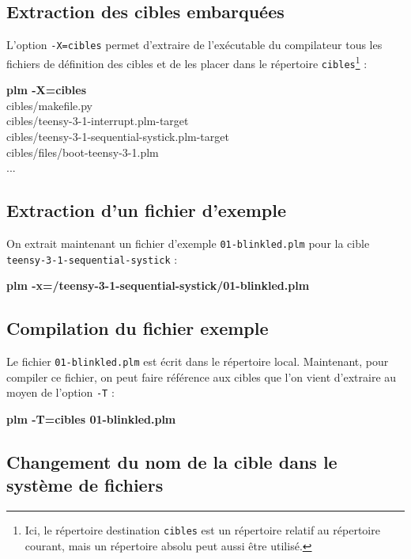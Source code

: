 \subsection{Extraction des cibles embarquées}
L'option \texttt{-X=cibles} permet d'extraire de l'exécutable du compilateur tous les fichiers de définition des cibles et de les placer dans le répertoire \texttt{cibles}\footnote{Ici, le répertoire destination \texttt{cibles} est un répertoire relatif au répertoire courant, mais un répertoire absolu peut aussi être utilisé.} :
\begin{SHELL}
{\bfseries plm -X=cibles}\\
\hspace*{1.2em}cibles/makef{}ile.py\\
\hspace*{1.2em}cibles/teensy-3-1-interrupt.plm-target\\
\hspace*{1.2em}cibles/teensy-3-1-sequential-systick.plm-target\\
\hspace*{1.2em}cibles/files/boot-teensy-3-1.plm\\
\hspace*{1.2em}...
\end{SHELL}

\subsection{Extraction d'un fichier d'exemple}
On extrait maintenant un fichier d'exemple \texttt{01-blinkled.plm} pour la cible \texttt{teensy-3-1-sequential-systick} :
\begin{SHELL}
\bfseries plm -x=/teensy-3-1-sequential-systick/01-blinkled.plm
\end{SHELL}

\subsection{Compilation du fichier exemple}
Le fichier \texttt{01-blinkled.plm} est écrit dans le répertoire local. Maintenant, pour compiler ce fichier, on peut faire référence aux cibles que l'on vient d'extraire au moyen de l'option \texttt{-T} :
\begin{SHELL}
\bfseries plm -T=cibles 01-blinkled.plm
\end{SHELL}


\subsection{Changement du nom de la cible dans le système de fichiers}


